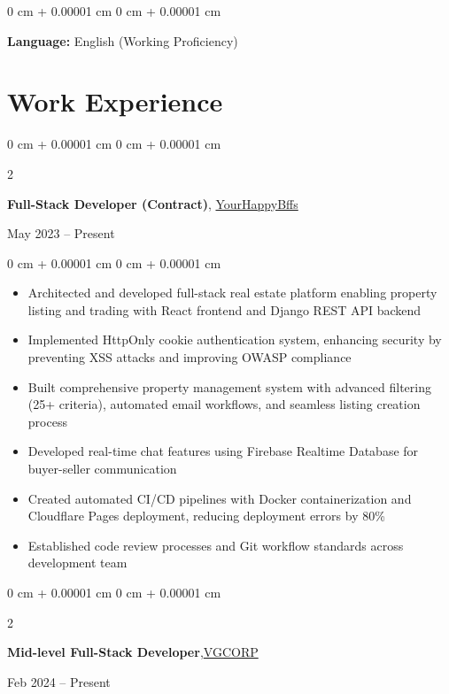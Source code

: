 \documentclass[10pt, letterpaper]{article}
\newenvironment{highlights}{
    \begin{itemize}[
        topsep=0.10 cm,
        parsep=0.10 cm,
        partopsep=0pt,
        itemsep=0pt,
        leftmargin=0 cm + 10pt
    ]
}{
    \end{itemize}
} %
\newenvironment{onecolentry}{
    \begin{adjustwidth}{
        0 cm + 0.00001 cm
    }{
        0 cm + 0.00001 cm
    }
}{
    \end{adjustwidth}
} %
\newenvironment{twocolentry}[2][]{
    \onecolentry
    \def\secondColumn{#2}
    \setcolumnwidth{\fill, 4.5 cm}
    \begin{paracol}{2}
}{
    \switchcolumn \raggedleft \secondColumn
    \end{paracol}
    \endonecolentry
} %
\begin{document}
        \vspace{0.2 cm}

        \begin{onecolentry}
            \textbf{Language:} English (Working Proficiency)
        \end{onecolentry}

    \section{Work Experience}

        \begin{twocolentry}{
            May 2023 – Present
        }
            \textbf{Full-Stack Developer (Contract)}, \href{https://www.linkedin.com/company/yourhappybffs}{YourHappyBffs}
        \end{twocolentry}

        \vspace{0.15 cm}
        \begin{onecolentry}
            \begin{highlights}
                \item Architected and developed full-stack real estate platform enabling property listing and trading with React frontend and Django REST API backend
                \item Implemented HttpOnly cookie authentication system, enhancing security by preventing XSS attacks and improving OWASP compliance
                \item Built comprehensive property management system with advanced filtering (25+ criteria), automated email workflows, and seamless listing creation process
                \item Developed real-time chat features using Firebase Realtime Database for buyer-seller communication
                \item Created automated CI/CD pipelines with Docker containerization and Cloudflare Pages deployment, reducing deployment errors by 80\%
                \item Established code review processes and Git workflow standards across development team
            \end{highlights}
        \end{onecolentry}

        \vspace{0.2 cm}

        \begin{twocolentry}{
            Feb 2024 – Present
        }   
            \textbf{Mid-level Full-Stack Developer},\href{https://www.vgcorp.vn}{VGCORP}
        \end{twocolentry}
\end{document}

